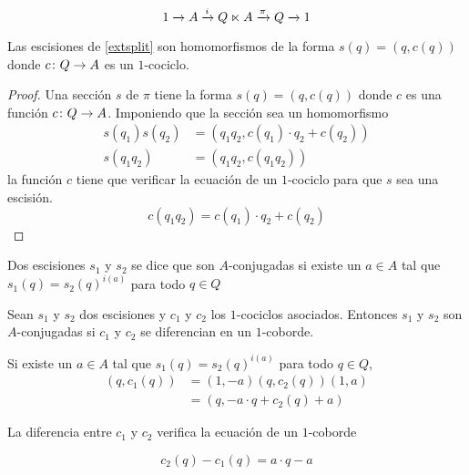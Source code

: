 \begin{equation}\label{extsplit}
	\extension i \pi A {Q \ltimes A} Q
\end{equation}

\begin{proposicion}
	Las escisiones de \eqref{extsplit} son homomorfismos de la forma $s(q) = (q,c(q))$ donde $\homo c Q A$ es un $1$-cociclo.
	\begin{proof}
		Una sección $s$ de $\pi$ tiene la forma $s(q) = (q,c(q))$ donde $c$ es una función $\homo c Q A$. Imponiendo que la sección sea un homomorfismo
		\begin{align*}
			s(q_1)s(q_2) &= (q_1q_2,c(q_1)\cdot q_2 + c(q_2)) \\
			s(q_1q_2) &= (q_1q_2,c(q_1q_2))
		\end{align*}
		la función $c$ tiene que verificar la ecuación de un $1$-cociclo para que $s$ sea una escisión.
		\begin{equation}
			c(q_1q_2) = c(q_1)\cdot q_2 + c(q_2)
		\end{equation}
	\end{proof}
\end{proposicion}

\begin{definicion}
	Dos escisiones $s_1$ y $s_2$ se dice que son $A$-conjugadas si existe un $a\in A$ tal que $s_1(q)=s_2(q)^{i(a)}$ para todo $q\in Q$
\end{definicion}

\begin{proposicion}
	Sean $s_1$ y $s_2$ dos escisiones y $c_1$ y $c_2$ los $1$-cociclos asociados. Entonces $s_1$ y $s_2$ son $A$-conjugadas si $c_1$ y $c_2$ se diferencian en un $1$-coborde.
	\begin{demostracion}
		Si existe un $a \in A$ tal que $s_1(q) = s_2(q)^{i(a)}$ para todo $q\in Q$, 
		\begin{align*}
		(q,c_1(q)) &= (1,-a)(q,c_2(q))(1,a) \\
					&= (q,-a \cdot q +  c_2(q) + a)
		\end{align*}
		
		La diferencia entre $c_1$ y $c_2$ verifica la ecuación de un $1$-coborde
		
		\begin{equation}
			c_2(q) - c_1(q) = a\cdot q - a
		\end{equation}
	\end{demostracion}
\end{proposicion}

